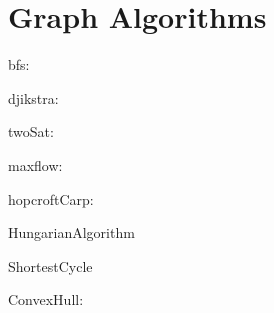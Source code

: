 \chapter{Graph Algorithms}

bfs:


djikstra:


twoSat:


maxflow:


hopcroftCarp:


HungarianAlgorithm


ShortestCycle


ConvexHull:




